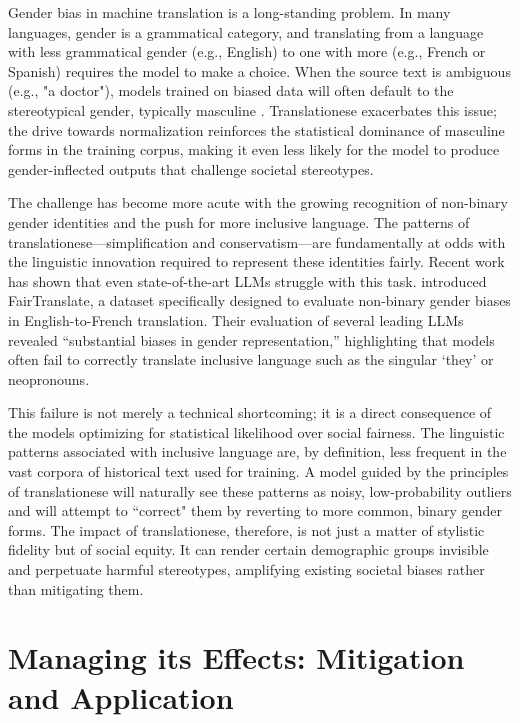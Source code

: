 \documentclass[11pt,a4paper]{article}
\begin{document}
Gender bias in machine translation is a long-standing problem. In many languages, gender is a grammatical category, and translating from a language with less grammatical gender (e.g., English) to one with more (e.g., French or Spanish) requires the model to make a choice. When the source text is ambiguous (e.g., "a doctor"), models trained on biased data will often default to the stereotypical gender, typically masculine \cite{vanmassenhove2018getting}. Translationese exacerbates this issue; the drive towards normalization reinforces the statistical dominance of masculine forms in the training corpus, making it even less likely for the model to produce gender-inflected outputs that challenge societal stereotypes.

The challenge has become more acute with the growing recognition of non-binary gender identities and the push for more inclusive language. The patterns of translationese---simplification and conservatism---are fundamentally at odds with the linguistic innovation required to represent these identities fairly. Recent work has shown that even state-of-the-art LLMs struggle with this task. \citet{jourdan2025fairtranslate} introduced FairTranslate, a dataset specifically designed to evaluate non-binary gender biases in English-to-French translation. Their evaluation of several leading LLMs revealed ``substantial biases in gender representation,'' highlighting that models often fail to correctly translate inclusive language such as the singular `they' or neopronouns.

This failure is not merely a technical shortcoming; it is a direct consequence of the models optimizing for statistical likelihood over social fairness. The linguistic patterns associated with inclusive language are, by definition, less frequent in the vast corpora of historical text used for training. A model guided by the principles of translationese will naturally see these patterns as noisy, low-probability outliers and will attempt to ``correct" them by reverting to more common, binary gender forms. The impact of translationese, therefore, is not just a matter of stylistic fidelity but of social equity. It can render certain demographic groups invisible and perpetuate harmful stereotypes, amplifying existing societal biases rather than mitigating them.

\section{Managing its Effects: Mitigation and Application}
\end{document}

